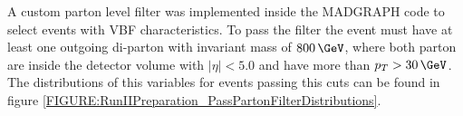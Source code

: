 A custom parton level filter was implemented inside the \textsc{MADGRAPH} code to select events with \gls{VBF} characteristics. To pass the filter the event must have at least one outgoing di-parton with invariant mass of $800\,\GeV$, where both parton are inside the detector volume with $|\eta|<5.0$ and have more than $p_{T}>30\,\GeV$. The distributions of this variables for events passing this cuts can be found in figure \ref{FIGURE:RunIIPreparation_PassPartonFilterDistributions}.

\begin{figure}[!htp]%
\centering
{}\qquad
{}\\
\qquad
{}\\

\end{figure}
